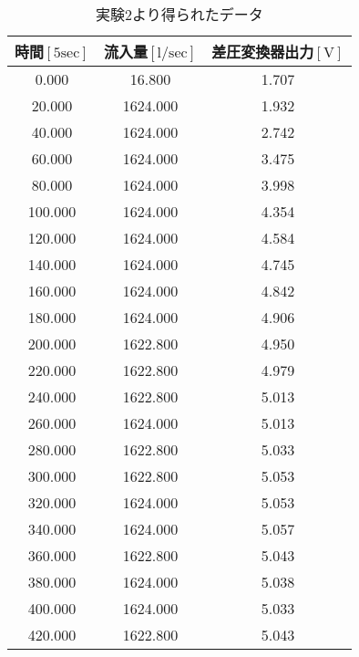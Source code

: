 \begin{table}[b]
  \begin{center}
    \caption{実験2より得られたデータ}
    \begin{tabular}{|c|c|c|} \hline
時間$\mathrm{[5sec]}$ & 流入量$\mathrm{[l/sec]}$ & 差圧変換器出力$\mathrm{[V]}$ \\ \hline \hline
0.000   & 16.800   & 1.707 \\ \hline
20.000  & 1624.000 & 1.932 \\ \hline
40.000  & 1624.000 & 2.742 \\ \hline
60.000  & 1624.000 & 3.475 \\ \hline
80.000  & 1624.000 & 3.998 \\ \hline
100.000	& 1624.000 & 4.354 \\ \hline
120.000	& 1624.000 & 4.584 \\ \hline
140.000	& 1624.000 & 4.745 \\ \hline
160.000	& 1624.000 & 4.842 \\ \hline
180.000	& 1624.000 & 4.906 \\ \hline
200.000	& 1622.800 & 4.950 \\ \hline
220.000	& 1622.800 & 4.979 \\ \hline
240.000	& 1622.800 & 5.013 \\ \hline
260.000	& 1624.000 & 5.013 \\ \hline
280.000	& 1622.800 & 5.033 \\ \hline
300.000	& 1622.800 & 5.053 \\ \hline
320.000	& 1624.000 & 5.053 \\ \hline
340.000	& 1624.000 & 5.057 \\ \hline
360.000	& 1622.800 & 5.043 \\ \hline
380.000	& 1624.000 & 5.038 \\ \hline
400.000	& 1624.000 & 5.033 \\ \hline
420.000	& 1622.800 & 5.043 \\ \hline
    \end{tabular}
    \label{tab:data2}
  \end{center}
\end{table}
